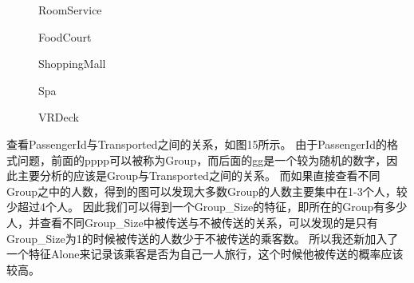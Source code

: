 \documentclass[../main.tex]{subfiles}
\begin{document}
        \begin{figure}[H]
            \centering
            \caption{RoomService}
        \end{figure}

        \begin{figure}[H]
            \centering
            \caption{FoodCourt}
        \end{figure}

        \begin{figure}[H]
            \centering
            \caption{ShoppingMall}
        \end{figure}

        \begin{figure}[H]
            \centering
            \caption{Spa}
        \end{figure}

        \begin{figure}[H]
            \centering
            \caption{VRDeck}
        \end{figure}

        查看PassengerId与Transported之间的关系，如图15所示。
        由于PassengerId的格式问题，前面的pppp可以被称为Group，而后面的gg是一个较为随机的数字，因此主要分析的应该是Group与Transported之间的关系。
        而如果直接查看不同Group之中的人数，得到的图可以发现大多数Group的人数主要集中在1-3个人，较少超过4个人。
        因此我们可以得到一个Group\_Size的特征，即所在的Group有多少人，并查看不同Group\_Size中被传送与不被传送的关系，可以发现的是只有Group\_Size为1的时候被传送的人数少于不被传送的乘客数。
        所以我还新加入了一个特征Alone来记录该乘客是否为自己一人旅行，这个时候他被传送的概率应该较高。
\end{document}
